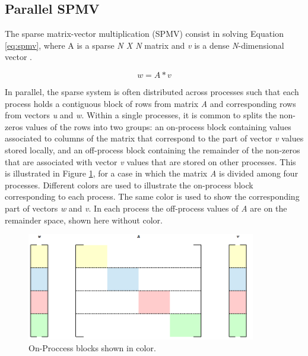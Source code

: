 \subsection*{Parallel SPMV}

The sparse matrix-vector multiplication (SPMV) consist in solving Equation \ref{eq:spmv}, where A is a sparse \emph{N X N} matrix and \emph{v} is a dense \emph{N}-dimensional vector \cite{BienzGO16}.


\begin{equation}
  w = A * v
\label{eq:spmv}  
\end{equation}

In parallel, the sparse system is often distributed across processes such that each process holds a contiguous block of rows from matrix \emph{A} and corresponding rows from vectors \emph{u} and \emph{w}. Within a single processes, it is common to splits the non-zeros values of the rows into two groups: an on-process block containing values associated to columns of the matrix that correspond to the part of vector \emph{v} values stored locally, and an off-process block containing the remainder of the non-zeros that are associated with vector \emph{v} values that are stored on other processes\cite{BienzGO16}. This is illustrated in Figure \ref{fig:Matrix}, for a case in which the matrix \emph{A} is divided among four processes. Different colors are used to illustrate the on-process block corresponding to each process. The same color is used to show the corresponding part of vectors \emph{w} and \emph{v}. In each process the off-process values of \emph{A} are on the remainder space, shown here without color.

\medskip

\begin{figure}[h!]
    \centering
    \includegraphics[width=100mm]{Plots/HybridProgramming/matrix.png}
    \caption{On-Proccess blocks shown in color.}
    \label{fig:Matrix}
\end{figure}

\medskip



